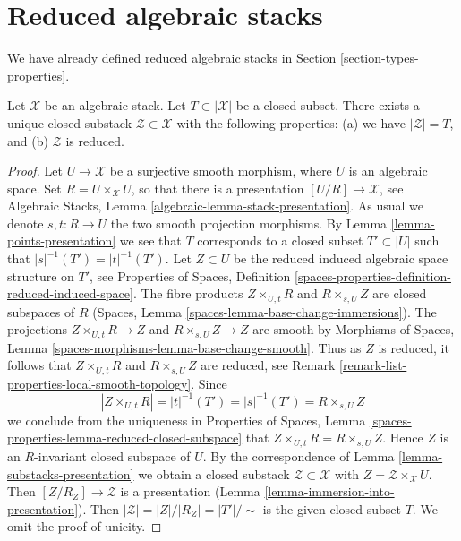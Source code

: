 \section{Reduced algebraic stacks}
\label{section-reduced}

\noindent
We have already defined reduced algebraic stacks in
Section \ref{section-types-properties}.

\begin{lemma}
\label{lemma-reduced-closed-substack}
Let $\mathcal{X}$ be an algebraic stack.
Let $T \subset |\mathcal{X}|$ be a closed subset.
There exists a unique closed substack $\mathcal{Z} \subset \mathcal{X}$
with the following properties:
(a) we have $|\mathcal{Z}| = T$, and (b) $\mathcal{Z}$ is reduced.
\end{lemma}

\begin{proof}
Let $U \to \mathcal{X}$ be a surjective smooth morphism, where $U$ is an
algebraic space. Set $R = U \times_\mathcal{X} U$, so that there is a
presentation $[U/R] \to \mathcal{X}$, see
Algebraic Stacks, Lemma \ref{algebraic-lemma-stack-presentation}.
As usual we denote $s, t : R \to U$ the two smooth projection morphisms.
By Lemma \ref{lemma-points-presentation}
we see that $T$ corresponds to a closed subset $T' \subset |U|$ such
that $|s|^{-1}(T') = |t|^{-1}(T')$.
Let $Z \subset U$ be the reduced induced algebraic space
structure on $T'$, see
Properties of Spaces,
Definition \ref{spaces-properties-definition-reduced-induced-space}.
The fibre products
$Z \times_{U, t} R$ and $R \times_{s, U} Z$ are closed subspaces
of $R$
(Spaces, Lemma \ref{spaces-lemma-base-change-immersions}).
The projections $Z \times_{U, t} R \to Z$ and
$R \times_{s, U} Z \to Z$ are smooth by
Morphisms of Spaces, Lemma \ref{spaces-morphisms-lemma-base-change-smooth}.
Thus as $Z$ is reduced, it follows that
$Z \times_{U, t} R$ and $R \times_{s, U} Z$ are reduced, see
Remark \ref{remark-list-properties-local-smooth-topology}.
Since
$$
|Z \times_{U, t} R| = |t|^{-1}(T') = |s|^{-1}(T') = R \times_{s, U} Z
$$
we conclude from the uniqueness in
Properties of Spaces,
Lemma \ref{spaces-properties-lemma-reduced-closed-subspace}
that $Z \times_{U, t} R = R \times_{s, U} Z$.
Hence $Z$ is an $R$-invariant closed subspace of $U$.
By the correspondence of
Lemma \ref{lemma-substacks-presentation}
we obtain a closed substack $\mathcal{Z} \subset \mathcal{X}$
with $Z = \mathcal{Z} \times_\mathcal{X} U$. Then
$[Z/R_Z] \to \mathcal{Z}$ is a presentation
(Lemma \ref{lemma-immersion-into-presentation}).
Then $|\mathcal{Z}| = |Z|/|R_Z| = |T'|/\sim$ is the given
closed subset $T$. We omit the proof of unicity.
\end{proof}

